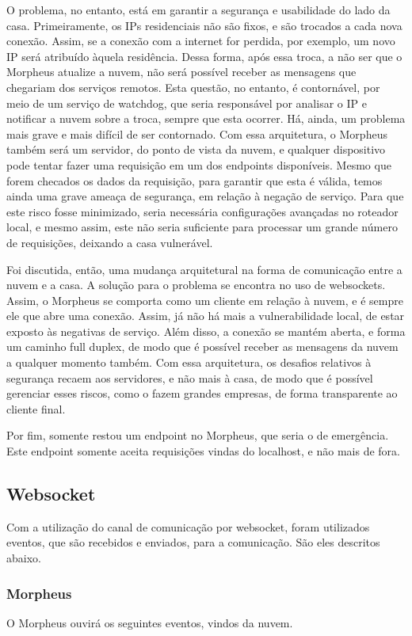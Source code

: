 O problema, no entanto, está em garantir a segurança e usabilidade do lado da casa. Primeiramente, os IPs residenciais não são fixos, e são trocados a cada nova conexão. Assim, se a conexão com a internet for perdida, por exemplo, um novo IP será atribuído àquela residência. Dessa forma, após essa troca, a não ser que o Morpheus atualize a nuvem, não será possível receber as mensagens que chegariam dos serviços remotos. Esta questão, no entanto, é contornável, por meio de um serviço de watchdog, que seria responsável por analisar o IP e notificar a nuvem sobre a troca, sempre que esta ocorrer. Há, ainda, um problema mais grave e mais difícil de ser contornado. Com essa arquitetura, o Morpheus também será um servidor, do ponto de vista da nuvem, e qualquer dispositivo pode tentar fazer uma requisição em um dos endpoints disponíveis. Mesmo que forem checados os dados da requisição, para garantir que esta é válida, temos ainda uma grave ameaça de segurança, em relação à negação de serviço. Para que este risco fosse minimizado, seria necessária configurações avançadas no roteador local, e mesmo assim, este não seria suficiente para processar um grande número de requisições, deixando a casa vulnerável.

Foi discutida, então, uma mudança arquitetural na forma de comunicação entre a nuvem e a casa. A solução para o problema se encontra no uso de websockets. Assim, o Morpheus se comporta como um cliente em relação à nuvem, e é sempre ele que abre uma conexão. Assim, já não há mais a vulnerabilidade local, de estar exposto às negativas de serviço. Além disso, a conexão se mantém aberta, e forma um caminho full duplex, de modo que é possível receber as mensagens da nuvem a qualquer momento também. Com essa arquitetura, os desafios relativos à segurança recaem aos servidores, e não mais à casa, de modo que é possível gerenciar esses riscos, como o fazem grandes empresas, de forma transparente ao cliente final.

Por fim, somente restou um endpoint no Morpheus, que seria o de emergência. Este endpoint somente aceita requisições vindas do localhost, e não mais de fora.

\subsection{Websocket}
Com a utilização do canal de comunicação por websocket, foram utilizados eventos, que são recebidos e enviados, para a comunicação. São eles descritos abaixo.

\subsubsection{Morpheus}
O Morpheus ouvirá os seguintes eventos, vindos da nuvem.

